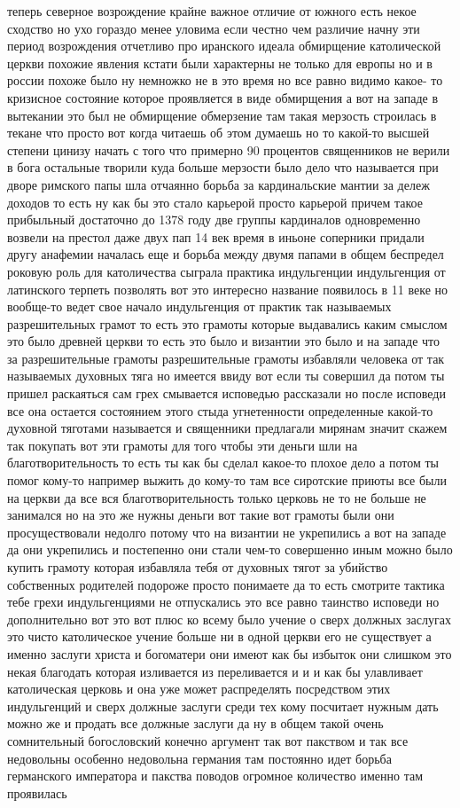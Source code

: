 теперь северное возрождение крайне важное отличие от
южного есть некое сходство но ухо гораздо менее уловима если честно чем различие
начну эти период возрождения отчетливо про иранского идеала обмирщение
католической церкви похожие явления кстати были характерны не только для европы
но и в россии похоже было ну немножко не в это время но все равно видимо какое-
то кризисное состояние которое проявляется в виде обмирщения а вот на западе в
вытекании это был не обмирщение обмерзение там такая мерзость строилась в текане
что просто вот когда читаешь об этом думаешь но то какой-то высшей степени
цинизу начать с того что примерно 90 процентов священников не верили в бога
остальные творили куда больше мерзости было дело что называется при дворе
римского папы шла отчаянно борьба за кардинальские мантии за дележ доходов то
есть ну как бы это стало карьерой просто карьерой причем такое прибыльный
достаточно до 1378 году две группы кардиналов одновременно возвели на престол
даже двух пап 14 век время в иньоне соперники придали другу анафемии началась
еще и борьба между двумя папами в общем беспредел роковую роль для католичества
сыграла практика индульгенции индульгенция от латинского терпеть позволять вот
это интересно название появилось в 11 веке но вообще-то ведет свое начало
индульгенция от практик так называемых разрешительных грамот то есть это грамоты
которые выдавались каким смыслом это было древней церкви то есть это было и
византии это было и на западе что за разрешительные грамоты разрешительные
грамоты избавляли человека от так называемых духовных тяга но имеется ввиду вот
если ты совершил да потом ты пришел раскаяться сам грех смывается исповедью
рассказали но после исповеди все она остается состоянием этого стыда
угнетенности определенные какой-то духовной тяготами называется и священники
предлагали мирянам значит скажем так покупать вот эти грамоты для того чтобы эти
деньги шли на благотворительность то есть ты как бы сделал какое-то плохое дело
а потом ты помог кому-то например выжить до кому-то там все сиротские приюты все
были на церкви да все вся благотворительность только церковь не то не больше не
занимался но на это же нужны деньги вот такие вот грамоты были они
просуществовали недолго потому что на византии не укрепились а вот на западе да
они укрепились и постепенно они стали чем-то совершенно иным можно было купить
грамоту которая избавляла тебя от духовных тягот за убийство собственных
родителей подороже просто понимаете да то есть смотрите тактика тебе грехи
индульгенциями не отпускались это все равно таинство исповеди но дополнительно
вот это вот плюс ко всему было учение о сверх должных заслугах это чисто
католическое учение больше ни в одной церкви его не существует а именно заслуги
христа и богоматери они имеют как бы избыток они слишком это некая благодать
которая изливается из переливается и и и как бы улавливает католическая церковь
и она уже может распределять посредством этих индульгенций и сверх должные
заслуги среди тех кому посчитает нужным дать можно же и продать все должные
заслуги да ну в общем такой очень сомнительный богословский конечно аргумент так
вот пакством и так все недовольны особенно недовольна германия там постоянно
идет борьба германского императора и пакства поводов огромное количество именно
там проявилась 

